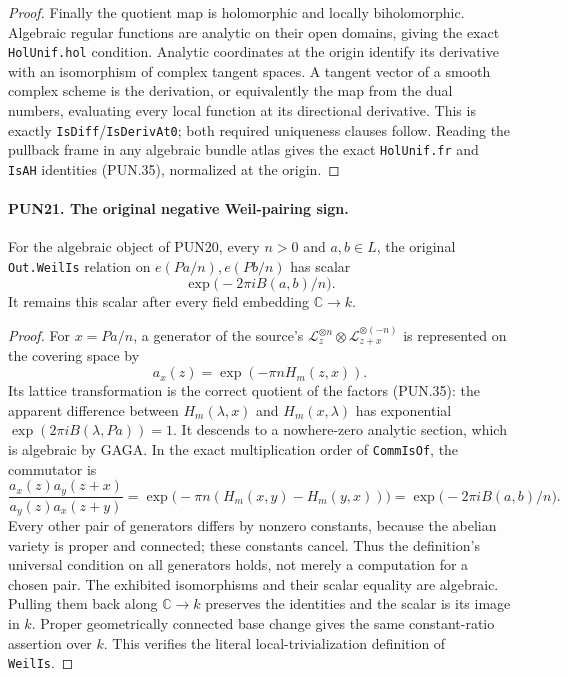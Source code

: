 \begin{proof}
Finally the quotient map is holomorphic and locally biholomorphic.
Algebraic regular functions are analytic on their open domains,
giving the exact \texttt{HolUnif.hol} condition.  Analytic
coordinates at the origin identify its derivative with an
isomorphism of complex tangent spaces.  A tangent vector of a
smooth complex scheme is the derivation, or equivalently the
map from the dual numbers, evaluating every local function at
its directional derivative.  This is exactly
\texttt{IsDiff}/\texttt{IsDerivAt0}; both required uniqueness
clauses follow.  Reading the pullback frame in any algebraic
bundle atlas gives the exact \texttt{HolUnif.fr} and
\texttt{IsAH} identities (PUN.35), normalized at the origin.
\end{proof}

\paragraph{PUN21. The original negative Weil-pairing sign.}
\label{claim:PUN21}
For the algebraic object of PUN20, every \(n>0\) and
\(a,b\in L\), the original \texttt{Out.WeilIs} relation on
\(e(Pa/n),e(Pb/n)\) has scalar
\[
                   \exp\bigl(-2\pi i B(a,b)/n\bigr).
 \tag{PUN.36}
\]
It remains this scalar after every field embedding
\(\mathbb C\to k\).

\begin{proof}
For \(x=Pa/n\), a generator of the source's
\(\mathcal L_z^{\otimes n}\otimes
\mathcal L_{z+x}^{\otimes(-n)}\) is represented on the
covering space by
\[
                         a_x(z)=\exp(-\pi n H_m(z,x)).
 \tag{PUN.37}
\]
Its lattice transformation is the correct quotient of the
factors (PUN.35): the apparent difference between
\(H_m(\lambda,x)\) and \(H_m(x,\lambda)\) has exponential
\(\exp(2\pi iB(\lambda,Pa))=1\).
It descends to a nowhere-zero analytic section, which is
algebraic by GAGA.  In the exact multiplication order of
\texttt{CommIsOf}, the commutator is
\[
 \frac{a_x(z)a_y(z+x)}{a_y(z)a_x(z+y)}
      =\exp\bigl(-\pi n(H_m(x,y)-H_m(y,x))\bigr)
      =\exp\bigl(-2\pi i B(a,b)/n\bigr).
 \tag{PUN.38}
\]
Every other pair of generators differs by nonzero constants,
because the abelian variety is proper and connected; these
constants cancel.  Thus the definition's universal condition on
all generators holds, not merely a computation for a chosen
pair.  The exhibited isomorphisms and their scalar equality
are algebraic.  Pulling them back along \(\mathbb C\to k\)
preserves the identities and the scalar is its image in \(k\).
Proper geometrically connected base change gives the same
constant-ratio assertion over \(k\).  This verifies the literal
local-trivialization definition of \texttt{WeilIs}.
\end{proof}

